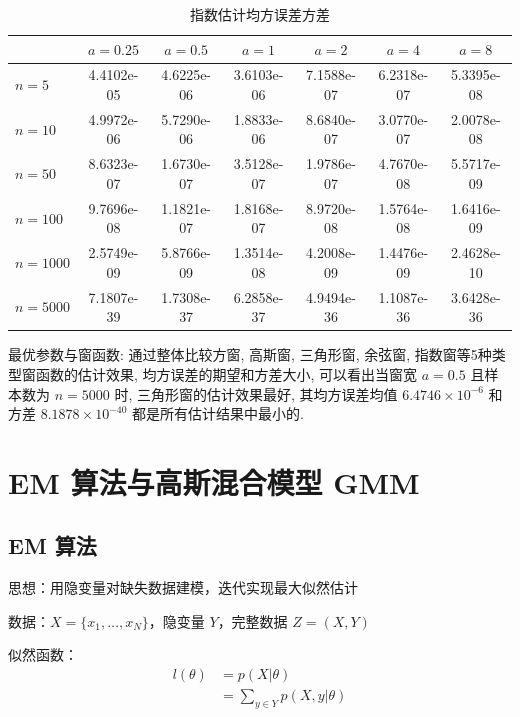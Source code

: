 \documentclass[openany]{ctexbook}
\theoremstyle{kaiti}
\theoremstyle{normal}
\begin{document}
\begin{table}[htbp]
  \centering
  \begin{tabular}{l|cccccc}
  \hline
           & $a=0.25$   & $a=0.5$    & $a=1$      & $a=2$      & $a=4$      & $a=8$      \\ \hline
  $n=5$    & 4.4102e-05 & 4.6225e-06 & 3.6103e-06 & 7.1588e-07 & 6.2318e-07 & 5.3395e-08 \\
  $n=10$   & 4.9972e-06 & 5.7290e-06 & 1.8833e-06 & 8.6840e-07 & 3.0770e-07 & 2.0078e-08 \\
  $n=50$   & 8.6323e-07 & 1.6730e-07 & 3.5128e-07 & 1.9786e-07 & 4.7670e-08 & 5.5717e-09 \\
  $n=100$  & 9.7696e-08 & 1.1821e-07 & 1.8168e-07 & 8.9720e-08 & 1.5764e-08 & 1.6416e-09 \\
  $n=1000$ & 2.5749e-09 & 5.8766e-09 & 1.3514e-08 & 4.2008e-09 & 1.4476e-09 & 2.4628e-10 \\
  $n=5000$ & 7.1807e-39 & 1.7308e-37 & 6.2858e-37 & 4.9494e-36 & 1.1087e-36 & 3.6428e-36 \\ \hline
  \end{tabular}
  \caption{指数估计均方误差方差}
  \label{tab:expVarMSE}
\end{table}

最优参数与窗函数: 通过整体比较方窗, 高斯窗, 三角形窗, 余弦窗, 指数窗等5种类型窗函数的估计效果, 均方误差的期望和方差大小, 可以看出当窗宽 $a=0.5$ 且样本数为 $n=5000$ 时, 三角形窗的估计效果最好, 其均方误差均值 $6.4746\times10^{-6}$ 和方差 $8.1878\times10^{-40}$ 都是所有估计结果中最小的.

\chapter{EM 算法与高斯混合模型 GMM}

\section{EM 算法}

思想：用隐变量对缺失数据建模，迭代实现最大似然估计

数据：$X=\{ x_1,\dots,x_N\}$，隐变量 $Y$，完整数据 $Z=\left(X,Y \right)$

似然函数：
\begin{equation}
\begin{aligned}
  l(\theta)
  &=p(X|\theta)\\
  &=\sum_{y\in Y}p\left(X,y|\theta \right)
\end{aligned}
\end{equation}
\end{document}

